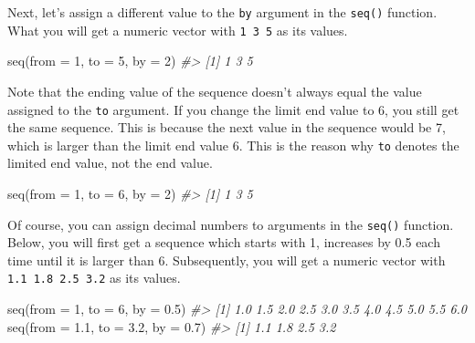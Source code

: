 \documentclass[
]{book}
\newenvironment{Shaded}{\begin{snugshade}}{\end{snugshade}}
\newcommand{\AttributeTok}[1]{\textcolor[rgb]{0.77,0.63,0.00}{#1}}
\newcommand{\CommentTok}[1]{\textcolor[rgb]{0.56,0.35,0.01}{\textit{#1}}}
\newcommand{\DecValTok}[1]{\textcolor[rgb]{0.00,0.00,0.81}{#1}}
\newcommand{\FloatTok}[1]{\textcolor[rgb]{0.00,0.00,0.81}{#1}}
\newcommand{\FunctionTok}[1]{\textcolor[rgb]{0.00,0.00,0.00}{#1}}
\newcommand{\NormalTok}[1]{#1}
\begin{document}
Next, let's assign a different value to the \texttt{by} argument in the \texttt{seq()} function. What you will get a numeric vector with \texttt{1\ 3\ 5} as its values.

\begin{Shaded}
\begin{Highlighting}[]
\FunctionTok{seq}\NormalTok{(}\AttributeTok{from =} \DecValTok{1}\NormalTok{, }\AttributeTok{to =} \DecValTok{5}\NormalTok{, }\AttributeTok{by =} \DecValTok{2}\NormalTok{)}
\CommentTok{\#\textgreater{} [1] 1 3 5}
\end{Highlighting}
\end{Shaded}

Note that the ending value of the sequence doesn't always equal the value assigned to the \texttt{to} argument. If you change the limit end value to 6, you still get the same sequence. This is because the next value in the sequence would be 7, which is larger than the limit end value 6. This is the reason why \texttt{to} denotes the limited end value, not the end value.

\begin{Shaded}
\begin{Highlighting}[]
\FunctionTok{seq}\NormalTok{(}\AttributeTok{from =} \DecValTok{1}\NormalTok{, }\AttributeTok{to =} \DecValTok{6}\NormalTok{, }\AttributeTok{by =} \DecValTok{2}\NormalTok{)}
\CommentTok{\#\textgreater{} [1] 1 3 5}
\end{Highlighting}
\end{Shaded}

Of course, you can assign decimal numbers to arguments in the \texttt{seq()} function. Below, you will first get a sequence which starts with 1, increases by 0.5 each time until it is larger than 6. Subsequently, you will get a numeric vector with \texttt{1.1\ 1.8\ 2.5\ 3.2} as its values.

\begin{Shaded}
\begin{Highlighting}[]
\FunctionTok{seq}\NormalTok{(}\AttributeTok{from =} \DecValTok{1}\NormalTok{, }\AttributeTok{to =} \DecValTok{6}\NormalTok{, }\AttributeTok{by =} \FloatTok{0.5}\NormalTok{) }
\CommentTok{\#\textgreater{}  [1] 1.0 1.5 2.0 2.5 3.0 3.5 4.0 4.5 5.0 5.5 6.0}
\FunctionTok{seq}\NormalTok{(}\AttributeTok{from =} \FloatTok{1.1}\NormalTok{, }\AttributeTok{to =} \FloatTok{3.2}\NormalTok{, }\AttributeTok{by =} \FloatTok{0.7}\NormalTok{) }
\CommentTok{\#\textgreater{} [1] 1.1 1.8 2.5 3.2}
\end{Highlighting}
\end{Shaded}
\end{document}

